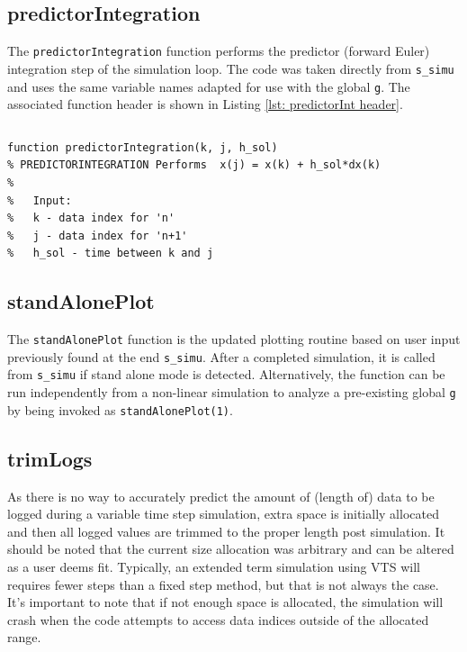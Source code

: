 \subsection{predictorIntegration}  
The \verb|predictorIntegration| function performs the predictor (forward Euler) integration step of the simulation loop.
The code was taken directly from \verb|s_simu| and uses the same variable names adapted for use with the global \verb|g|.
The associated function header is shown in Listing \ref{lst: predictorInt header}.

\vspace{-1.2 em}
\begin{lstlisting}[caption={Function Header for predictorIntegration},label={lst: predictorInt header}]
\end{lstlisting}\vspace{-2.1 em}
\begin{verbatim}
function predictorIntegration(k, j, h_sol)
% PREDICTORINTEGRATION Performs  x(j) = x(k) + h_sol*dx(k)
%
%   Input:
%   k - data index for 'n'
%   j - data index for 'n+1'
%   h_sol - time between k and j
\end{verbatim}

\subsection{standAlonePlot}  
The \verb|standAlonePlot| function is the updated plotting routine based on user input previously found at the end \verb|s_simu|.
After a completed simulation, it is called from \verb|s_simu| if stand alone mode is detected.
Alternatively, the function can be run independently from a non-linear simulation to analyze a pre-existing global \verb|g| by being invoked as \verb|standAlonePlot(1)|.

\subsection{trimLogs}  
As there is no way to accurately predict the amount of (length of) data to be logged during a variable time step simulation, 
extra space is initially allocated and then all logged values are trimmed to the proper length post simulation.
It should be noted that the current size allocation was arbitrary and can be altered as a user deems fit.
Typically, an extended term simulation using VTS will requires fewer steps than a fixed step method, but that is not always the case.
It's important to note that if not enough space is allocated, the simulation will crash when the code attempts to access data indices outside of the allocated range.

